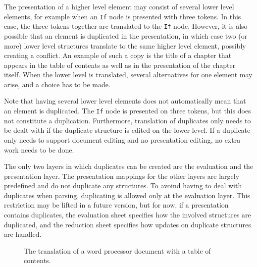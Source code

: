 

The presentation of a higher level element may consist of several lower level elements, for example when an \verb|If| node is presented with three tokens. In this case, the three tokens together are translated to the \verb|If| node. However, it is also possible that an element is duplicated in the presentation, in which case two (or more) lower level structures  translate to the same higher level element, possibly creating a conflict. An example of such a copy is the title of a chapter that appears in the table of contents as well as in the presentation of the chapter itself. When the lower level is translated, several alternatives for one element may arise, and a choice has to be made. 

Note that having several lower level elements does not automatically mean that an element is duplicated. The  \verb|If| node is presented on three tokens, but this does not constitute a duplication. Furthermore, translation of duplicates only needs to be dealt with if the duplicate structure is edited on the lower level. If a duplicate only needs to support document editing and no presentation editing, no extra work needs to be done.

The only two layers in which duplicates can be created are the evaluation and the presentation layer. The presentation mappings for the other layers are largely predefined and do not duplicate any structures. To avoind having to deal with duplicates when parsing, duplicating is allowed only at the evaluation layer. This restriction may be lifted in a future version, but for now, if a presentation contains duplicates, the evaluation sheet specifies how the involved structures are duplicated, and the reduction sheet specifies how updates on duplicate structures are handled.

\begin{figure}
\begin{center}
\begin{center}
%
%
\end{center}
\caption{The translation of a word processor document with a table of contents.}\label{translateExample} 
\end{center}
\end{figure}

